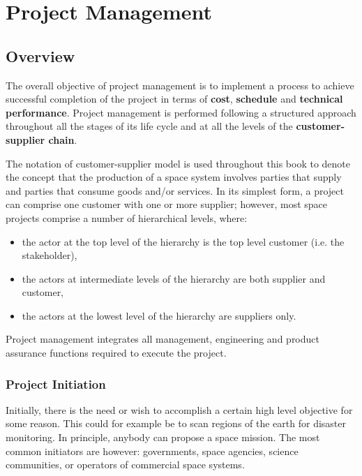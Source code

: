 \chapter{Project Management}

\section{Overview}

The overall objective of project management is to implement a process to achieve successful completion of the project in terms of \textbf{cost}, \textbf{schedule} and \textbf{technical performance}. Project management is performed following a structured approach throughout all the stages of its life cycle and at all the levels of the \textbf{customer-supplier chain}.

The notation of customer-supplier model is used throughout this book to denote the concept that  the production of a space system involves parties that supply and parties that consume goods and/or services. In its simplest form, a project can comprise one customer with one or more supplier; however, most space projects comprise a number of hierarchical levels, where:

\begin{itemize}
\item the actor at the top level of the hierarchy is the top level customer (i.e. the stakeholder),
\item the actors at intermediate levels of the hierarchy are both supplier and
customer,
\item the actors at the lowest level of the hierarchy are suppliers only.
\end{itemize}

Project management integrates all management, engineering and product assurance functions required to execute the project.

\subsection{Project Initiation} 

Initially, there is the need or wish to accomplish a certain high level objective for some reason. This could for example be to scan regions of the earth for disaster monitoring. In principle, anybody can propose a space mission. The most common initiators are however: governments, space agencies, science communities, or operators of commercial space systems.


